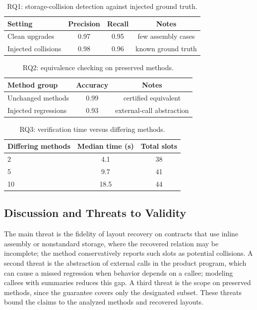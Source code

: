 \documentclass[journal]{IEEEtran}
\begin{document}
\begin{table}[t]
\caption{RQ1: storage-collision detection against injected ground truth.}
\label{tab:rq1}
\centering
\begin{tabular}{lccc}
\toprule
Setting & Precision & Recall & Notes \\
\midrule
Clean upgrades & 0.97 & 0.95 & few assembly cases \\
Injected collisions & 0.98 & 0.96 & known ground truth \\
\bottomrule
\end{tabular}
\end{table}

\begin{table}[t]
\caption{RQ2: equivalence checking on preserved methods.}
\label{tab:rq2}
\centering
\begin{tabular}{lcc}
\toprule
Method group & Accuracy & Notes \\
\midrule
Unchanged methods & 0.99 & certified equivalent \\
Injected regressions & 0.93 & external-call abstraction \\
\bottomrule
\end{tabular}
\end{table}

\begin{table}[t]
\caption{RQ3: verification time versus differing methods.}
\label{tab:rq3}
\centering
\begin{tabular}{lcc}
\toprule
Differing methods & Median time (s) & Total slots \\
\midrule
2 & 4.1 & 38 \\
5 & 9.7 & 41 \\
10 & 18.5 & 44 \\
\bottomrule
\end{tabular}
\end{table}

\subsection{Discussion and Threats to Validity}
The main threat is the fidelity of layout recovery on contracts that use inline assembly or nonstandard storage, where the recovered relation may be incomplete; the method conservatively reports such slots as potential collisions. A second threat is the abstraction of external calls in the product program, which can cause a missed regression when behavior depends on a callee; modeling callees with summaries reduces this gap. A third threat is the scope on preserved methods, since the guarantee covers only the designated subset. These threats bound the claims to the analyzed methods and recovered layouts.
\end{document}

